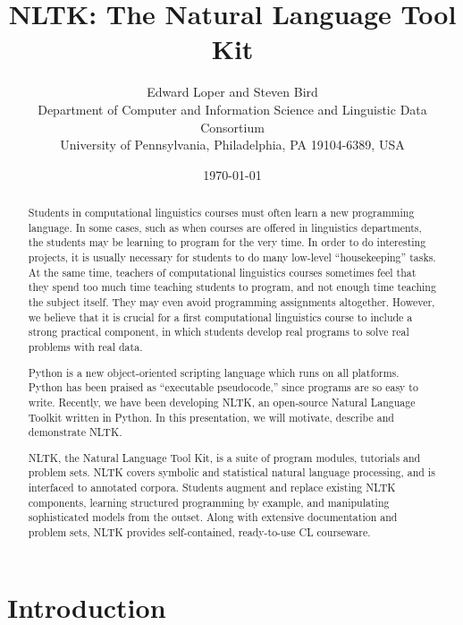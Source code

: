 \documentclass[11pt]{article}
\title{NLTK: The Natural Language Tool Kit}
\author{
Edward Loper and Steven Bird\\
Department of Computer and Information Science and Linguistic Data Consortium\\
University of Pennsylvania, Philadelphia, PA 19104-6389, USA
}
\date{\today}
\begin{document}
\makeidpage
\maketitle

\begin{abstract}
Students in computational linguistics courses must often learn
a new programming language.  In some cases, such as when courses
are offered in linguistics departments,
the students may be learning to program for the very time.
In order to do interesting projects, it is usually necessary for
students to do many low-level ``housekeeping'' tasks.  At the same
time, teachers of computational linguistics courses sometimes feel
that they spend too much time teaching students to program, and not
enough time teaching the subject itself.  They may even avoid
programming assignments altogether.  However, we believe that it is
crucial for a first computational linguistics course to include a
strong practical component, in which students develop real programs to
solve real problems with real data.

Python is a new object-oriented scripting language which runs on all
platforms.  Python has been praised as ``executable pseudocode,'' since
programs are so easy to write.  Recently, we have been developing
NLTK, an open-source Natural Language Toolkit written in Python.
In this presentation, we will motivate, describe and demonstrate NLTK.

NLTK, the Natural Language Tool Kit, is a suite of program modules,
tutorials and problem sets.  NLTK covers symbolic and statistical
natural language processing, and is interfaced to annotated corpora.
Students augment and replace existing NLTK components, learning
structured programming by example, and manipulating sophisticated
models from the outset.  Along with extensive documentation and
problem sets, NLTK provides self-contained, ready-to-use CL
courseware.
\end{abstract}

\section{Introduction}
\end{document}
